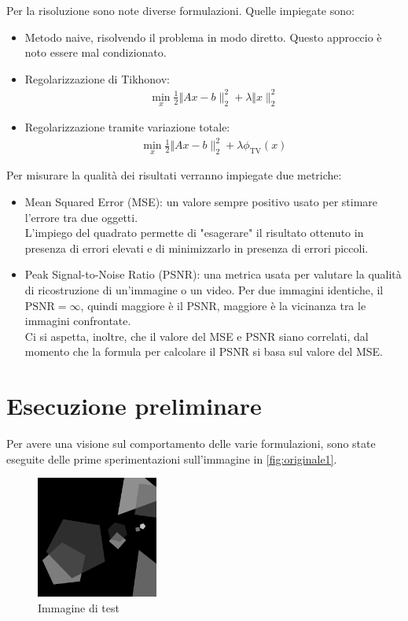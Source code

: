 \documentclass[11pt]{article}
\begin{document}
Per la risoluzione sono note diverse formulazioni. Quelle impiegate sono:
\begin{itemize}
    \setlength\itemsep{0.05cm}
    \item Metodo naive, risolvendo il problema in modo diretto. Questo approccio è noto essere mal condizionato.
    \item Regolarizzazione di Tikhonov:
    \begin{align*}
    	\min\limits_{x} \frac{1}{2} \Vert Ax-b \|_{2}^{2} + \lambda \Vert x \|_{2}^{2}
    \end{align*}
    \item Regolarizzazione tramite variazione totale:
    \begin{align*}
    	\min\limits_{x} \frac{1}{2} \Vert Ax-b \|_{2}^{2} + \lambda \phi_{\text{TV}}(x)
    \end{align*}

\end{itemize}
Per misurare la qualità dei risultati verranno impiegate due metriche:
\begin{itemize}
    \setlength\itemsep{0.05cm}
    \item Mean Squared Error (MSE): un valore sempre positivo usato per stimare l'errore tra due oggetti. \\
    L'impiego del quadrato permette di "esagerare" il risultato ottenuto in presenza di errori elevati e di minimizzarlo in presenza di errori piccoli.
    \item Peak Signal-to-Noise Ratio (PSNR): una metrica usata per valutare la qualità di ricostruzione di un'immagine o un video. Per due immagini identiche, il $\text{PSNR}=\infty$, quindi maggiore è il PSNR, maggiore è la vicinanza tra le immagini confrontate.\\
	Ci si aspetta, inoltre, che il valore del MSE e PSNR siano correlati, dal momento che la formula per calcolare il PSNR si basa sul valore del MSE.
\end{itemize}




\newpage
\section{Esecuzione preliminare}
\label{chap:lambda}
Per avere una visione sul comportamento delle varie formulazioni, sono state eseguite delle prime sperimentazioni sull'immagine in \autoref{fig:originale1}.
\begin{figure}[H]
    \centering
    \includegraphics[width=4cm]{esecuzione/originale.png}
    \caption{Immagine di test}
    \label{fig:originale1}
\end{figure}
\end{document}
